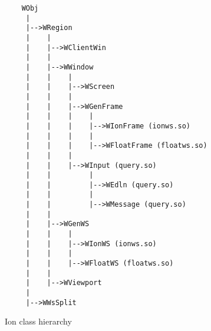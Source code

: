 \begin{figure}
\iftrue
\begin{verbatim}
    WObj
     |
     |-->WRegion
     |    |
     |    |-->WClientWin
     |    |
     |    |-->WWindow
     |    |    |
     |    |    |-->WScreen
     |    |    |
     |    |    |-->WGenFrame
     |    |    |    |
     |    |    |    |-->WIonFrame (ionws.so)
     |    |    |    |
     |    |    |    |-->WFloatFrame (floatws.so)
     |    |    |
     |    |    |-->WInput (query.so)
     |    |         |
     |    |         |-->WEdln (query.so)
     |    |         |
     |    |         |-->WMessage (query.so)
     |    |
     |    |-->WGenWS
     |    |    |
     |    |    |-->WIonWS (ionws.so)
     |    |    |
     |    |    |-->WFloatWS (floatws.so)
     |    |
     |    |-->WViewport
     |
     |-->WWsSplit
\end{verbatim}
\fi
%
\caption{Ion class hierarchy}
\label{fig:classhierarchy}
\end{figure}

